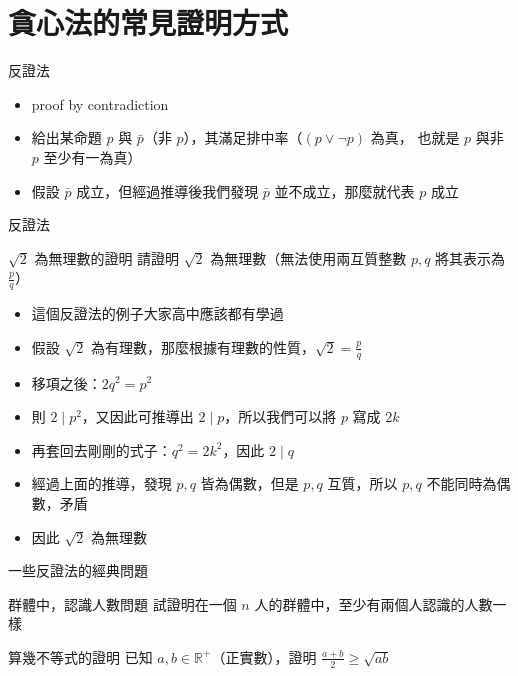\documentclass[aspectratio=169]{beamer}
\begin{document}
    \section{貪心法的常見證明方式}

    \begin{frame}{反證法}
        \begin{itemize}
            \item<1-> proof by contradiction
            \item<1-> 給出某命題 $p$ 與 $\bar{p}$（非 $p$），其滿足排中率（${\displaystyle (p\vee \neg p)}$ 為真，
            也就是 $p$ 與非 $p$ 至少有一為真）
            \item<2-> 假設 $\bar{p}$ 成立，但經過推導後我們發現 $\bar{p}$ 並不成立，那麼就代表 $p$ 成立
        \end{itemize}
    \end{frame}

    \begin{frame}{反證法}
        \begin{block}{$\sqrt{2}$ 為無理數的證明}
            請證明 $\sqrt{2}$ 為無理數（無法使用兩互質整數 $p, q$ 將其表示為 $\frac{p}{q}$）
        \end{block}

        \begin{itemize}
            \item<1-> 這個反證法的例子大家高中應該都有學過
            \item<2-> 假設 $\sqrt{2}$ 為有理數，那麼根據有理數的性質，$\sqrt{2} = \frac{p}{q}$
            \item<3-> 移項之後：$2q^2 = p^2$
            \item<4-> 則 $2 \mid p^2$，又因此可推導出 $2 \mid p$，所以我們可以將 $p$ 寫成 $2k$
            \item<5-> 再套回去剛剛的式子：$q^2 = 2k^2$，因此 $2 \mid q$
            \item<6-> 經過上面的推導，發現 $p, q$ 皆為偶數，但是 $p, q$ 互質，所以 $p, q$ 不能同時為偶數，矛盾
            \item<7-> 因此 $\sqrt{2}$ 為無理數
        \end{itemize}
    \end{frame}

    \begin{frame}{一些反證法的經典問題}
        \begin{block}{群體中，認識人數問題}
            試證明在一個 $n$ 人的群體中，至少有兩個人認識的人數一樣
        \end{block}

        \begin{block}{算幾不等式的證明}
            已知 $a, b \in \mathbb{R}^+$（正實數），證明 $\frac{a + b}{2} \ge \sqrt{ab}$
        \end{block}
    \end{frame}
    
\end{document}
